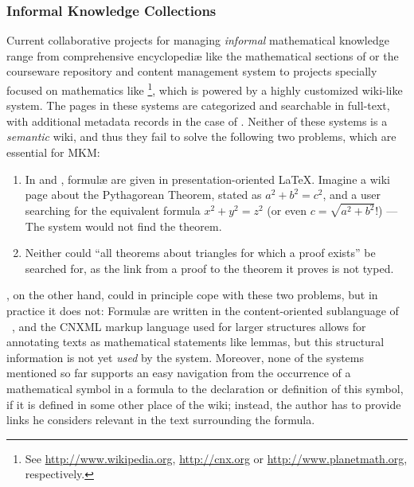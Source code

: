 \subsubsection{Informal Knowledge Collections}
\label{sec:math-knowledge-collections}

Current collaborative projects for managing \emph{informal} mathematical knowledge range
from comprehensive encyclopediæ like the mathematical sections of  or
the courseware repository and content management system  to projects
specially focused on mathematics like \footnote{See
  \url{http://www.wikipedia.org}, \url{http://cnx.org} or \url{http://www.planetmath.org},
  respectively.}, which is powered by a highly customized wiki-like system.  The pages in
these systems are categorized and searchable in full-text, with additional metadata
records in the case of .  Neither of these systems is a
\emph{semantic} wiki, and thus they fail to solve the following two problems, which are
essential for MKM:

\begin{enumerate}
\item\label{item:formula-search-usecase} In  and ,
  formulæ are given in presentation-oriented {\LaTeX}.  Imagine a wiki page about the
  Pythagorean Theorem, stated as $a^2 + b^2 = c^2$, and a user searching for the
  equivalent formula $x^2 + y^2 = z^2$ (or even $c=\sqrt{a^2+b^2}$!) --- The system would
  not find the theorem.
\item Neither could ``all theorems about triangles for which a
  proof exists'' be searched for, as the link from a proof to the theorem it proves is not
  typed.
\end{enumerate}

, on the other hand, could in principle cope with these two problems,
but in practice it does not: Formulæ are written in the content-oriented sublanguage of
{\mathml}~\cite{CarlisleEd:MathML07}, and the CNXML markup language used for larger
structures allows for annotating texts as mathematical statements like lemmas, but this
structural information is not yet \emph{used} by the system.  Moreover, none of the
systems mentioned so far supports an easy navigation from the occurrence of a mathematical
symbol in a formula to the declaration or definition of this symbol, if it is defined in
some other place of the wiki; instead, the author has to provide links he considers
relevant in the text surrounding the formula.

